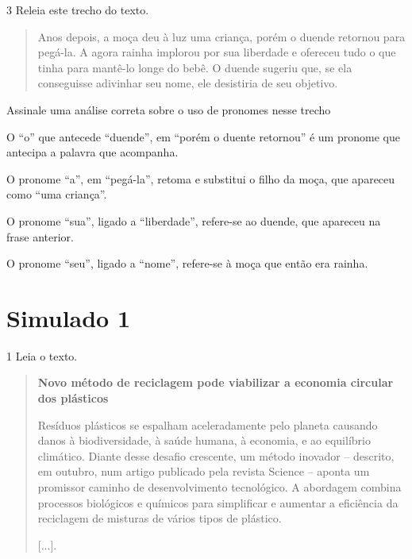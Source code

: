 \num{3} Releia este trecho do texto.

\begin{quote}
Anos depois, a moça deu à luz uma criança, porém o duende retornou para
pegá-la. A agora rainha implorou por sua liberdade e ofereceu tudo o que
tinha para mantê-lo longe do bebê. O duende sugeriu que, se ela
conseguisse adivinhar seu nome, ele desistiria de seu objetivo.
\end{quote}

Assinale uma análise correta sobre o uso de pronomes nesse trecho

\begin{escolha}
\item O “o” que antecede “duende”, em “porém o duente retornou” é um pronome que antecipa a palavra que acompanha.

\item O pronome “a”, em “pegá-la”, retoma e substitui o filho da moça, que apareceu como “uma criança”.

\item O pronome “sua”, ligado a “liberdade”, refere-se ao duende, que apareceu na frase anterior.

\item O pronome “seu”, ligado a “nome”, refere-se à moça que então era rainha.
\end{escolha}


\chapter{Simulado 1}

\num{1} Leia o texto.

\begin{quote}
\textbf{Novo método de reciclagem pode viabilizar a economia circular dos plásticos}

Resíduos plásticos se espalham aceleradamente pelo planeta causando
danos à biodiversidade, à saúde humana, à economia, e ao equilíbrio
climático. Diante desse desafio crescente, um método inovador --
descrito, em outubro, num artigo publicado pela revista Science --
aponta um promissor caminho de desenvolvimento tecnológico. A abordagem
combina processos biológicos e químicos para simplificar e aumentar a
eficiência da reciclagem de misturas de vários tipos de plástico.

{[}...{]}.

\end{quote}

